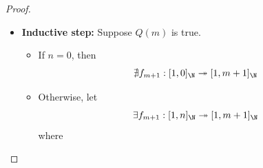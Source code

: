 \begin{proof}
\begin{enumerate}[label=\textbf{(\Alph*)}]
\begin{itemize}
\begin{itemize}
\[                          \]
                          Then
                          \[
                            \begin{array}{c}
                              n \neq 0 \implies \nexists f_{m}: [1, n]_{\N} \twoheadrightarrow [1, m]_{\N} \\
                              \Downarrow                                                                   \\
                              Q(0) \text{ is true}
                            \end{array}
                          \]
                    \item \textbf{($m = 1$)} Suppose $n \in [0, \infty)_{\N}$. Consider
                          \[
                            \begin{array}{c}
                              \neg(m = 0) \\
                              \Downarrow  \\
                              n \geq m \geq 1 \lor n = m = 0 \iff n \geq m \geq 1 \iff n \geq 1
                            \end{array}
                          \]
                          Then
                          \[
                            \begin{array}{c}
                              n < 1 \implies \nexists f_{m}: [1, n]_{\N} \twoheadrightarrow [1, m]_{\N} \\
                              \Downarrow                                                                \\
                              Q(1) \text{ is true}
                            \end{array}
                          \]
                  \end{itemize}
            \item \textbf{Inductive step:} Suppose $Q(m)$ is true.
                  \begin{itemize}
                    \item If $n = 0$, then
                          \[
                            \nexists f_{m + 1}: [1, 0]_{\N} \twoheadrightarrow [1, m + 1]_{\N}
                          \]
                    \item Otherwise, let
                          \[
                            \exists f_{m + 1}: [1, n]_{\N} \twoheadrightarrow [1, m + 1]_{\N}
                          \]
                          where

\end{itemize}
\end{itemize}
\end{enumerate}
\end{proof}

